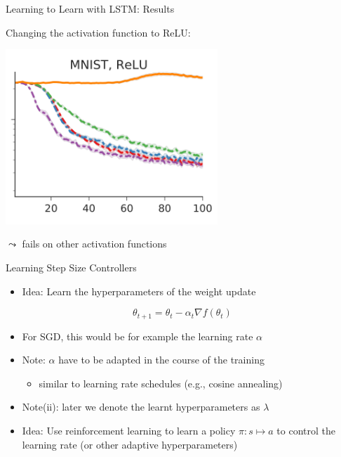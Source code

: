 \begin{frame}[c]{Learning to Learn with LSTM: Results\newline {}}

Changing the activation function to ReLU:
\smallskip

\centering
\includegraphics[width=0.6\textwidth]{images/l2l_mnist_relu}

$\leadsto$ fails on other activation functions

\end{frame}
\begin{frame}[c]{Learning Step Size Controllers }

\begin{itemize}
	\item \alert{Idea:} Learn the hyperparameters of the weight update 
\end{itemize}

\begin{equation}
\theta_{t+1} = \theta_t - \alpha_t \nabla f(\theta_t) \nonumber
\end{equation}

\begin{itemize}
	\item For SGD, this would be for example the learning rate $\alpha$
	\pause
	\item \alert{Note}: $\alpha$ have to be adapted in the course of the training
	\begin{itemize}
		\item similar to learning rate schedules (e.g., cosine annealing)
	\end{itemize}
	\pause
	\item \alert{Note(ii)}: later we denote the learnt hyperparameters as $\lambda$
	\medskip
	\pause
	\item \alert{Idea:} Use reinforcement learning to learn a policy $\pi: s \mapsto a$ to control the learning rate (or other adaptive hyperparameters)
\end{itemize}



\end{frame}
